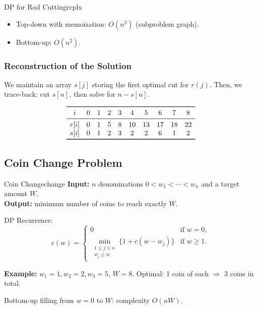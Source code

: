 \begin{complexity}{DP for Rod Cutting}{rcplx}
\begin{itemize}[noitemsep]
  \item Top-down with memoization: $O(n^2)$ (subproblem graph).
  \item Bottom-up: $O(n^2)$.
\end{itemize}
\end{complexity}

\subsubsection{Reconstruction of the Solution}

We maintain an array $s[j]$ storing the first optimal cut for $r(j)$.
Then, we trace-back: cut $s[n]$, then solve for $n - s[n]$.

\[
\begin{array}{cccccccccc}
\toprule
i    & 0 & 1 & 2 & 3 & 4  & 5  & 6  & 7  & 8  \\
\midrule
r[i] & 0 & 1 & 5 & 8 & 10 & 13 & 17 & 18 & 22 \\
s[i] & 0 & 1 & 2 & 3 &  2 &  2 &  6 &  1 &  2 \\
\bottomrule
\end{array}
\]

\subsection{Coin Change Problem}

\begin{definition}{Coin Change}{change}
\textbf{Input:} $n$ denominations $0 < w_1 < \cdots < w_n$ and a target amount $W$. \\
\textbf{Output:} minimum number of coins to reach exactly $W$.
\end{definition}

DP Recurrence:
\[
  c(w) =
  \begin{cases}
    0 & \text{if } w = 0, \\
    \displaystyle\min_{\substack{1 \le j \le n \\ w_j \le w}} \bigl\{1 + c(w - w_j)\bigr\}
       & \text{if } w \ge 1.
  \end{cases}
\]

\textbf{Example:} $w_1=1, w_2=2, w_3=5$, $W=8$.
Optimal: 1 coin of each $\Rightarrow$ 3 coins in total.

Bottom-up filling from $w=0$ to $W$: complexity $O(nW)$.

